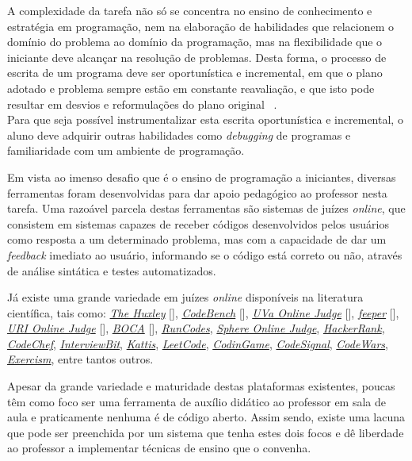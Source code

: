 A complexidade da tarefa não só se concentra no ensino de conhecimento e 
estratégia em programação, nem na elaboração de habilidades que relacionem o domínio 
do problema ao domínio da programação, mas na flexibilidade que o iniciante deve 
alcançar na resolução de problemas. Desta forma, o processo de escrita 
de um programa deve  ser oportunística e incremental, em que o plano adotado 
e problema sempre estão em 
constante reavaliação, e que isto pode resultar em desvios e reformulações do plano
original \ \cite{visser1990more}. \\
Para que seja possível instrumentalizar esta escrita oportunística e incremental, 
o aluno deve adquirir outras habilidades como \emph{debugging} de programas e 
familiaridade com um ambiente de programação.

Em vista ao imenso desafio que é o ensino de programação a iniciantes, diversas ferramentas 
foram desenvolvidas para dar apoio pedagógico ao professor nesta tarefa. Uma razoável parcela 
destas ferramentas são sistemas de juízes \emph{online}, que consistem em sistemas capazes 
de receber códigos desenvolvidos pelos usuários como resposta a um determinado problema, mas 
com a capacidade de dar um \emph{feedback} imediato ao usuário, informando 
se o código está correto ou não, através de análise sintática e testes automatizados.

Já existe uma grande variedade em juízes \emph{online} disponíveis na literatura científica,
tais como: 
\hyperref[link:the_huxley]{\emph{The Huxley}} [], 
	\hyperref[link:code_bench]{\emph{CodeBench}} [],  
	\hyperref[link:uva_judge]{\emph{UVa Online Judge}} [], 
	\hyperref[link:feeper]{\emph{feeper}} [], 
	\hyperref[link:uri_judge]{\emph{URI Online Judge}} [], 
	\hyperref[link:boca]{\emph{BOCA}} [],
	\hyperref[link:we_run_codes]{\emph{RunCodes}},
	\hyperref[link:sphere_judge]{\emph{Sphere Online Judge}},
	\hyperref[link:hacker_rank]{\emph{HackerRank}}, 
	\hyperref[link:code_chef]{\emph{CodeChef}}, 
	\hyperref[link:interview_bit]{\emph{InterviewBit}}, 
	\hyperref[link:kattis]{\emph{Kattis}}, 
	\hyperref[link:leet_code]{\emph{LeetCode}}, 
	\hyperref[link:codin_game]{\emph{CodinGame}}, 
	\hyperref[link:code_signal]{\emph{CodeSignal}}, 
	\hyperref[link:code_wars]{\emph{CodeWars}}, 
	\hyperref[link:exercism]{\emph{Exercism}}, 
	entre tantos outros.

Apesar da grande variedade e maturidade destas plataformas existentes, poucas 
têm como foco ser uma ferramenta de auxílio didático ao professor em sala de aula e 
praticamente nenhuma é de código aberto. Assim sendo, existe uma lacuna que pode
ser preenchida por um sistema que tenha estes dois focos e dê liberdade ao professor 
a implementar técnicas de ensino que o convenha.


